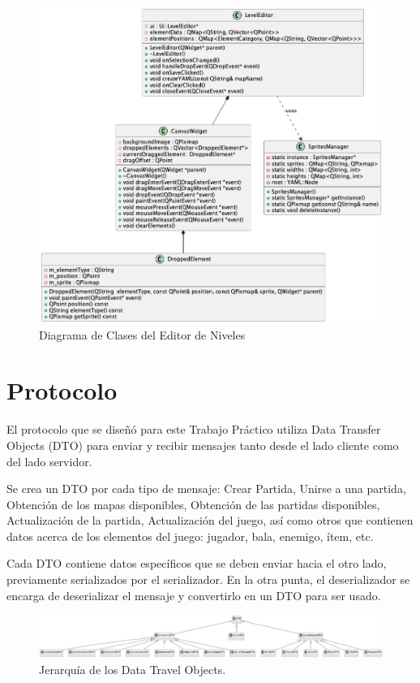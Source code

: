 \documentclass[titlepage,a4paper]{article}
\begin{document}
\begin{figure}[H]
  \centering
  \includegraphics[scale=0.4]{images/Level Editor.png}
  \caption{Diagrama de Clases del Editor de Niveles}
  \label{fig:editor}
\end{figure}

\section{Protocolo}
El protocolo que se diseñó para este Trabajo Práctico utiliza Data Transfer Objects (DTO) para enviar y recibir mensajes tanto desde el lado cliente como del lado servidor.

Se crea un DTO por cada tipo de mensaje: Crear Partida, Unirse a una partida, Obtención de los mapas disponibles, Obtención de las partidas disponibles, Actualización de la partida, Actualización del juego, así como otros que contienen datos acerca de los elementos del juego: jugador, bala, enemigo, ítem, etc.

Cada DTO contiene datos específicos que se deben enviar hacia el otro lado, previamente serializados por el serializador. En la otra punta, el deserializador se encarga de deserializar el mensaje y convertirlo en un DTO para ser usado.

\begin{figure}[H]
  \centering
  \includegraphics[scale=0.28, angle=270]{images/DTO Hierarchy.png}
  \caption{Jerarquía de los Data Travel Objects.}
  \label{fig:dto}
\end{figure}
\end{document}
